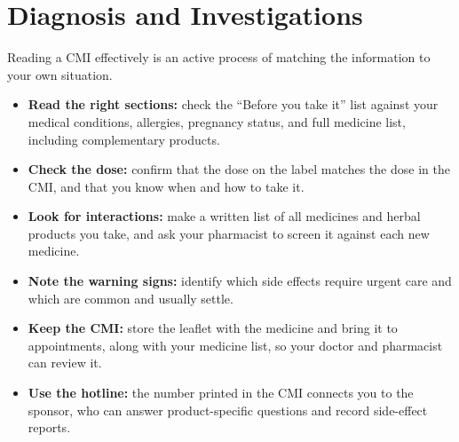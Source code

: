 \section*{Diagnosis and Investigations}
Reading a CMI effectively is an active process of matching the information to your own situation.
\begin{itemize}
    \item \textbf{Read the right sections:} check the ``Before you take it'' list against your medical conditions, allergies, pregnancy status, and full medicine list, including complementary products.
    \item \textbf{Check the dose:} confirm that the dose on the label matches the dose in the CMI, and that you know when and how to take it.
    \item \textbf{Look for interactions:} make a written list of all medicines and herbal products you take, and ask your pharmacist to screen it against each new medicine.
    \item \textbf{Note the warning signs:} identify which side effects require urgent care and which are common and usually settle.
    \item \textbf{Keep the CMI:} store the leaflet with the medicine and bring it to appointments, along with your medicine list, so your doctor and pharmacist can review it.
    \item \textbf{Use the hotline:} the number printed in the CMI connects you to the sponsor, who can answer product-specific questions and record side-effect reports.
\end{itemize}

